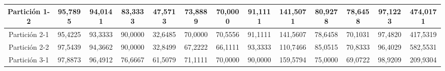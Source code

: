 \documentclass[12pt]{article}
\begin{document}
\begin{table}[H]
{\begin{tabular}{|c|cccc|cccc|cccc|}
Partición 1-2 & \multicolumn{1}{c|}{95,7895}                                                  & \multicolumn{1}{c|}{94,0141}                                                 & \multicolumn{1}{c|}{83,3333} & 47,5713 & \multicolumn{1}{c|}{73,8889}                                                  & \multicolumn{1}{c|}{70,0000}                                                 & \multicolumn{1}{c|}{91,1111} & 141,5071 & \multicolumn{1}{c|}{80,9278}                                                  & \multicolumn{1}{c|}{78,6458}                                                 & \multicolumn{1}{c|}{97,1223} & 474,0171 \\ \hline
Partición 2-1 & \multicolumn{1}{c|}{95,4225}                                                  & \multicolumn{1}{c|}{93,3333}                                                 & \multicolumn{1}{c|}{90,0000} & 32,6485 & \multicolumn{1}{c|}{70,0000}                                                  & \multicolumn{1}{c|}{70,5556}                                                 & \multicolumn{1}{c|}{91,1111} & 141,5607 & \multicolumn{1}{c|}{78,6458}                                                  & \multicolumn{1}{c|}{70,1031}                                                 & \multicolumn{1}{c|}{97,4820} & 417,5319 \\ \hline
Partición 2-2 & \multicolumn{1}{c|}{97,5439}                                                  & \multicolumn{1}{c|}{94,3662}                                                 & \multicolumn{1}{c|}{90,0000} & 32,8499 & \multicolumn{1}{c|}{67,2222}                                                  & \multicolumn{1}{c|}{66,1111}                                                 & \multicolumn{1}{c|}{93,3333} & 110,7466 & \multicolumn{1}{c|}{85,0515}                                                  & \multicolumn{1}{c|}{70,8333}                                                 & \multicolumn{1}{c|}{96,4029} & 582,5531 \\ \hline
Partición 3-1 & \multicolumn{1}{c|}{97,8873}                                                  & \multicolumn{1}{c|}{96,4912}                                                 & \multicolumn{1}{c|}{76,6667} & 61,5079 & \multicolumn{1}{c|}{71,1111}                                                  & \multicolumn{1}{c|}{70,0000}                                                 & \multicolumn{1}{c|}{90,0000} & 159,5794 & \multicolumn{1}{c|}{75,0000}                                                  & \multicolumn{1}{c|}{69,0722}                                                 & \multicolumn{1}{c|}{98,9209} & 209,9304 \\ \hline

\end{tabular}}
\end{table}
\end{document}
